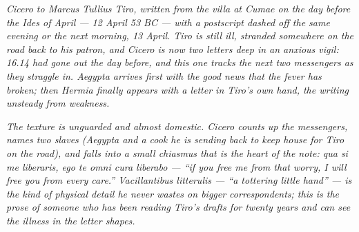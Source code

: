 
\textit{Cicero to Marcus Tullius Tiro, written from the villa at
Cumae on the day before the Ides of April --- 12 April 53 BC ---
with a postscript dashed off the same evening or the next morning,
13 April. Tiro is still ill, stranded somewhere on the road back
to his patron, and Cicero is now two letters deep in an anxious
vigil: 16.14 had gone out the day before, and this one tracks
the next two messengers as they straggle in. Aegypta arrives
first with the good news that the fever has broken; then Hermia
finally appears with a letter in Tiro's own hand, the writing
unsteady from weakness.}

\textit{The texture is unguarded and almost domestic. Cicero
counts up the messengers, names two slaves (Aegypta and a cook
he is sending back to keep house for Tiro on the road), and
falls into a small chiasmus that is the heart of the note:
\textit{qua si me liberaris, ego te omni cura liberabo} ---
``if you free me from that worry, I will free you from every
care.'' \textit{Vacillantibus litterulis} --- ``a tottering
little hand'' --- is the kind of physical detail he never wastes
on bigger correspondents; this is the prose of someone who has
been reading Tiro's drafts for twenty years and can see the
illness in the letter shapes.}
